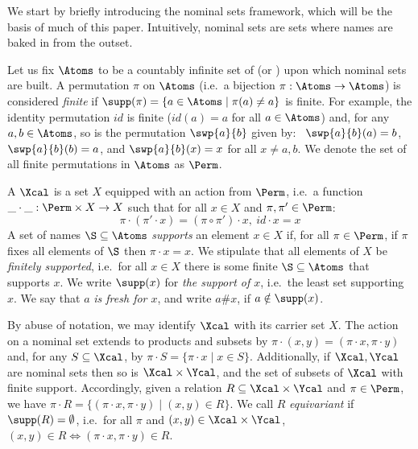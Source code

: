 
We start by briefly introducing the nominal sets framework, which will be the basis of much of this paper. Intuitively, nominal sets are sets where names are baked in from the outset.

Let us fix $\Atoms$ to be a countably infinite set of  (or ) upon which nominal sets are built. 
    A permutation $\pi$ on $\Atoms$ (i.e.\ a bijection $\pi:\Atoms\to\Atoms$) is considered \emph{finite} if $\supp(\pi) = \{a \in \Atoms\mid \pi(a) \neq a\}$ is finite.
 For example, the identity permutation $id$ is finite ($id(a)=a$ for all $a\in\Atoms$) and, for any $a,b\in\Atoms$, so is the permutation $\swp{a}{b}$ given by:\ 
$\swp{a}{b}(a) = b$, $\swp{a}{b}(b) = a$, and $\swp{a}{b}(x) = x$ for all $x\neq a,b$.  
 We denote the set of all finite permutations in $\Atoms$ as $\Perm$.
                       
\begin{definition}[\cite{PittsGabbay,Pitts}]\label{def:nomset}
    A  $\Xcal$ is a set $X$ equipped with an action from $\Perm$, i.e.\ a function $\_ \cdot \_: \Perm \times X \rightarrow X$ such that for all $x \in X$ and  $\pi, \pi' \in \Perm$:
    \[
    \pi \cdot (\pi' \cdot x) = (\pi \circ \pi') \cdot x,\ id \cdot x = x
    \]
    A set of names $\S\subseteq \Atoms$ \emph{supports} an element $x \in X$ if, for all $\pi \in \Perm$, if $\pi$ fixes all elements of $\S$ then $\pi\cdot x=x$. We stipulate that all elements of $X$ be \emph{finitely supported}, i.e.\ for all $x\in X$ there is some finite $\S\subseteq\Atoms$ that supports $x$. We write $\supp(x)$ for \emph{the support of $x$}, i.e.\ the least set supporting $x$. We say that $a$ \emph{is fresh for $x$}, and write $a\# x$, if $a\notin\supp(x)$.
\end{definition}

By abuse of notation, we may identify $\Xcal$ with its carrier set $X$. 
The action on a nominal set extends to products and subsets by $\pi \cdot(x,y) = (\pi \cdot x, \pi \cdot y)$ and, for any $S \subseteq \Xcal$, by $\pi \cdot S = \{\pi \cdot x \mid x \in S\}$. 
Additionally, if $\Xcal, \Ycal$ are nominal sets then so is $\Xcal \times \Ycal$, and the set of subsets of $\Xcal$ with finite support.
Accordingly, given a relation $R\subseteq\Xcal\times\Ycal$ and $\pi\in\Perm$, we have $\pi\cdot R=\{(\pi\cdot x,\pi\cdot y)\mid (x,y)\in R\}$. We call $R$ \emph{equivariant} if $\supp(R)=\emptyset$, i.e.\ for all $\pi$ and $(x,y)\in\Xcal\times\Ycal$, $(x,y)\in R\iff (\pi\cdot x,\pi\cdot y)\in R$. 

